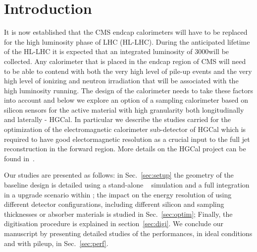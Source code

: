 %
%
%
\clearpage
\section{Introduction}
\label{sec:intro}

It is now established that the CMS endcap calorimeters will have to be replaced for the high
luminosity phase of LHC (HL-LHC). During the anticipated lifetime of
the HL-LHC it is expected
that an integrated luminosity of 3000\fbinv will be collected.
Any calorimeter that is placed in the endcap region of CMS will need to be able to contend with both the very high level of pile-up
events and the very high level of ionizing and neutron irradiation that will be associated with the
high luminosity running. The design of the calorimeter needs to take these factors into account
and below we explore an option of a sampling calorimeter based on silicon sensors for the active
material with high granularity both longitudinally and laterally - HGCal.
In particular we describe the studies carried for the optimization of
the electromagnetic calorimeter sub-detector of HGCal which is
required to have good electormagnetic resolution as a crucial input to
the full jet reconstruction in the forward region.
More details on the HGCal project can be found in~\cite{HGCal}.

Our studies are presented as follows:
in Sec.~\ref{sec:setup} the geometry of the baseline design is
detailed using a stand-alone ~\cite{1610988,Agostinelli:2002hh}
simulation and a full integration in a upgrade scenario within \CMSSW;
the impact on the energy resolution of using different detector
configurations,
including different silicon and sampling thicknesses or absorber
materials is studied in Sec.~\ref{sec:optim};
Finally, the digitisation procedure is explained in
section~\ref{sec:digi}. 
We conclude our manuscript by presenting detailed
studies of the performances, in ideal conditions and with pileup, in Sec.~\ref{sec:perf}.